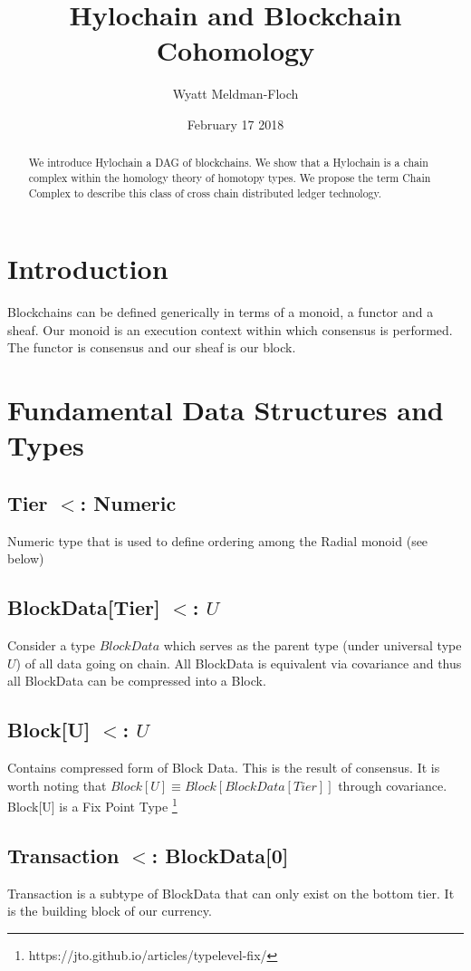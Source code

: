 \documentclass{article}
\title{Hylochain and Blockchain Cohomology}
\author{Wyatt Meldman-Floch}
\date{February 17 2018}
\begin{document}
\maketitle

\begin{abstract}
We introduce Hylochain a DAG of blockchains. We show that a Hylochain is a chain complex within the homology theory of homotopy types. We propose the term Chain Complex to describe this class of cross chain distributed ledger technology.

\end{abstract}
\setcounter{secnumdepth}{0}
\section{Introduction}
Blockchains can be defined generically in terms of a monoid, a functor and a sheaf. Our monoid is an execution context within which consensus is performed. The functor is consensus and our sheaf is our block.

\section{Fundamental Data Structures and Types}
\subsection{Tier $<$: Numeric}
Numeric type that is used to define ordering among the Radial monoid (see below)

\subsection{BlockData[Tier] $<$: $U$}
Consider a type $BlockData$ which serves as the parent type (under universal type $U$) of all data going on chain. All BlockData is equivalent via covariance and thus all BlockData can be compressed into a Block.

\subsection{Block[U] $<$: $U$}
Contains compressed form of Block Data. This is the result of consensus. It is worth noting that $Block[U] \equiv Block[BlockData[Tier]]$ through covariance. Block[U] is a Fix Point Type \footnote{https://jto.github.io/articles/typelevel-fix/}

\subsection{Transaction $<$: BlockData[0]}
Transaction is a subtype of BlockData that can only exist on the bottom tier. It is the building block of our currency.
\end{document}
